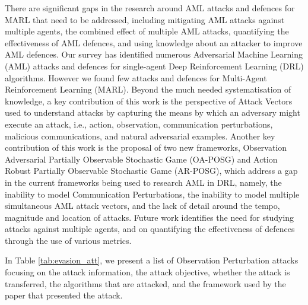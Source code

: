 \documentclass[conference,compsoc]{IEEEtran}
\begin{document}
There are significant gaps in the research around AML attacks and defences for MARL that need to be addressed, including mitigating AML attacks against multiple agents, the combined effect of multiple AML attacks, quantifying the effectiveness of AML defences, and using knowledge about an attacker to improve AML defences.
Our survey has identified numerous Adversarial Machine Learning (AML) attacks and defences for single-agent Deep Reinforcement Learning (DRL) algorithms. However we found few attacks and defences for Multi-Agent Reinforcement Learning (MARL). Beyond the much needed systematisation of knowledge, a key contribution of this work is the perspective of Attack Vectors used to understand attacks by capturing the means by which an adversary might execute an attack, i.e., action, observation, communication perturbations, malicious communications, and natural adversarial examples. Another key contribution of this work is the proposal of two new frameworks, Observation Adversarial Partially Observable Stochastic Game (OA-POSG) and Action Robust Partially Observable Stochastic Game (AR-POSG), which address a gap in the current frameworks being used to research AML in DRL, namely, the inability to model Communication Perturbations, the inability to model multiple simultaneous AML attack vectors, and the lack of detail around the tempo, magnitude and location of attacks. Future work identifies the need for studying attacks against multiple agents, and on quantifying the effectiveness of defences through the use of various metrics.

\newpage



\appendix{}

In Table \ref{tab:evasion_att}, we present a list of Observation Perturbation attacks focusing on the attack information, the attack objective, whether the  attack is transferred, the algorithms that are attacked, and the framework used by the paper that presented the attack. 
\end{document}
